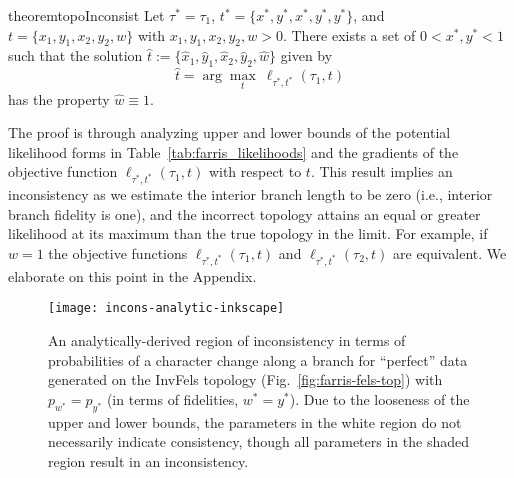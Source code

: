 \documentclass[11pt]{article}
\newcommand{\nCols}{n}
\begin{document}

\begin{restatable}{theorem}{topoInconsist}
Let $\tau^*=\tau_1$, $t^*=\{x^*, y^*, x^*, y^*, y^*\}$, and $t=\{x_1, y_1, x_2, y_2, w\}$ with $x_1, y_1, x_2, y_2, w > 0$.
There exists a set of $0 < x^*, y^* < 1$ such that the solution $\hat{t} := \{\hat{x}_1,\hat{y}_1,\hat{x}_2,\hat{y}_2,\hat{w}\}$ given by
\[
\hat{t} = \arg\max_{t} \ \ell_{\tau^*,t^*}(\tau_1, t)
\]
has the property $\hat{w}\equiv 1$.
\end{restatable}

The proof is through analyzing upper and lower bounds of the potential likelihood forms in Table~\ref{tab:farris_likelihoods} and the gradients of the objective function $\ell_{\tau^*,t^*}(\tau_1, t)$ with respect to $t$.
This result implies an inconsistency as we estimate the interior branch length to be zero (i.e., interior branch fidelity is one), and the incorrect topology attains an equal or greater likelihood at its maximum than the true topology in the limit.
For example, if $w=1$ the objective functions $\ell_{\tau^*,t^*}(\tau_1, t)$ and $\ell_{\tau^*,t^*}(\tau_2, t)$ are equivalent.
We elaborate on this point in the Appendix.

\begin{figure}
\centering
\texttt{[image: incons-analytic-inkscape]}
\caption{
    An analytically-derived region of inconsistency in terms of probabilities of a character change along a branch for ``perfect'' data generated on the InvFels topology (Fig.~\ref{fig:farris-fels-top}) with $p_{w^*} = p_{y^*}$ (in terms of fidelities, $w^*=y^*$).
    Due to the looseness of the upper and lower bounds, the parameters in the white region do not necessarily indicate consistency, though all parameters in the shaded region result in an inconsistency.
}
\label{fig:incons-analytic}
\end{figure}
\end{document}
